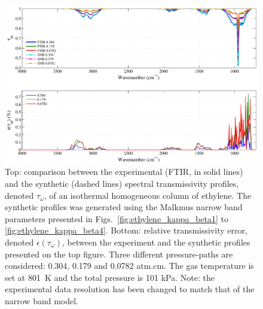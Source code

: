 \begin{figure}[p]
\includegraphics[width=\textwidth]{Figures/Comparison_Fit_Ethylene_MALKMUS_Temp801K.pdf}
\caption{Top: comparison between the experimental (FTIR, in solid lines) and the synthetic (dashed lines) spectral transmissivity profiles, denoted $\tau_{\omega}$, of an isothermal homogeneous column of ethylene. The synthetic profiles was generated using the Malkmus narrow band parameters presented in Figs.~\ref{fig:ethylene_kappa_beta1} to \ref{fig:ethylene_kappa_beta4}. Bottom: relative transmissivity error, denoted $\epsilon{(\tau_{\omega})}$, between the experiment and the synthetic profiles presented on the top figure. Three different pressure-paths are considered: 0.304, 0.179 and 0.0782 atm.cm. The gas temperature is set at 801~K and the total pressure is 101 kPa. Note: the experimental data resolution has been changed to match that of the narrow band model. \label{fig:ethylene_SNBVerify_801K}}
\end{figure}

